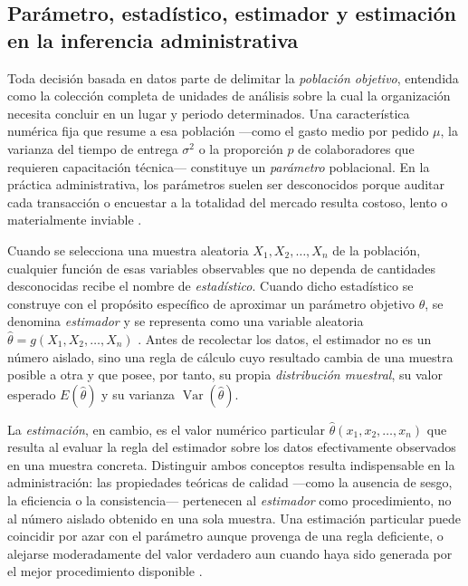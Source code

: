 {\subsection{Parámetro, estadístico, estimador y estimación en la inferencia administrativa}
Toda decisión basada en datos parte de delimitar la \textit{población objetivo}, entendida como la colección completa de unidades de análisis sobre la cual la organización necesita concluir en un lugar y periodo determinados. Una característica numérica fija que resume a esa población —como el gasto medio por pedido $\mu$, la varianza del tiempo de entrega $\sigma^2$ o la proporción $p$ de colaboradores que requieren capacitación técnica— constituye un \textit{parámetro} poblacional. En la práctica administrativa, los parámetros suelen ser desconocidos porque auditar cada transacción o encuestar a la totalidad del mercado resulta costoso, lento o materialmente inviable \citep[caps.~1 y 8]{holmesBusiness2023}.

Cuando se selecciona una muestra aleatoria $X_1, X_2, \dots, X_n$ de la población, cualquier función de esas variables observables que no dependa de cantidades desconocidas recibe el nombre de \textit{estadístico}. Cuando dicho estadístico se construye con el propósito específico de aproximar un parámetro objetivo $\theta$, se denomina \textit{estimador} y se representa como una variable aleatoria $\hat{\theta}=g(X_1, X_2, \dots, X_n)$ \citep[sec.~8.1]{wackerly2010}. Antes de recolectar los datos, el estimador no es un número aislado, sino una regla de cálculo cuyo resultado cambia de una muestra posible a otra y que posee, por tanto, su propia \textit{distribución muestral}, su valor esperado $E(\hat{\theta})$ y su varianza $\operatorname{Var}(\hat{\theta})$.

La \textit{estimación}, en cambio, es el valor numérico particular $\hat{\theta}(x_1, x_2, \dots, x_n)$ que resulta al evaluar la regla del estimador sobre los datos efectivamente observados en una muestra concreta. Distinguir ambos conceptos resulta indispensable en la administración: las propiedades teóricas de calidad —como la ausencia de sesgo, la eficiencia o la consistencia— pertenecen al \textit{estimador} como procedimiento, no al número aislado obtenido en una sola muestra. Una estimación particular puede coincidir por azar con el parámetro aunque provenga de una regla deficiente, o alejarse moderadamente del valor verdadero aun cuando haya sido generada por el mejor procedimiento disponible \citep{wackerly2010,holmesBusiness2023}.

}
